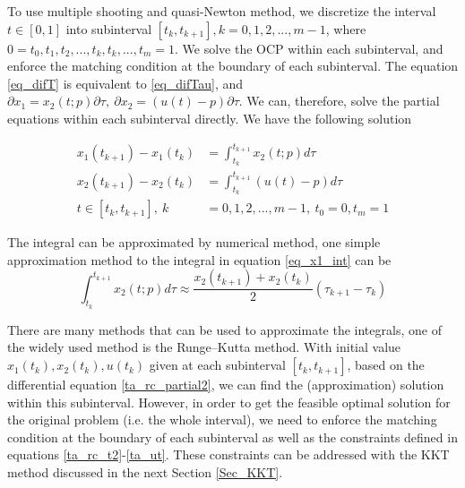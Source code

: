 	To use multiple shooting and quasi-Newton method, we discretize the interval $t\in [0,1]$ into subinterval $[t_{k}, t_{k+1}], k = 0, 1, 2, ..., m-1$, where $0 = t_0, t_1, t_2, ...,t_k, t_k, ..., t_m = 1$. We solve the OCP within each subinterval, and enforce the matching condition at the boundary of each subinterval. The equation \ref{eq_difT} is equivalent to \ref{eq_difTau}, and $\partial x_1= x_2(t;p) \partial \tau, \ \partial x_2 = ( u(t)-p) \partial \tau$. We can, therefore, solve the partial equations within each subinterval directly. We have the following solution
	
	\begin{subequations}
		\begin{align}
			x_1(t_{k+1}) -  x_1(t_k)  &= \int_{t_k}^{t_{k+1}} x_2(t;p) d \tau \label{eq_x1_int} \\
			x_2(t_{k+1}) -  x_2(t_k)  &= \int_{t_k}^{t_{k+1}} (u(t)-p) d \tau \\
			t \in [t_{k}, t_{k+1}], \  k &= 0, 1, 2, ..., m-1, \  t_0 =0, t_m =1
		\end{align}
	\end{subequations}
	
	The integral can be approximated by numerical method, one simple approximation method to the integral in equation \ref{eq_x1_int} can be 
	\begin{equation}
		\int_{t_k}^{t_{k+1}} x_2(t;p) d \tau  \approx \frac{x_2(t_{k+1}) + x_2(t_k)}{2} (\tau_{k+1} -\tau_k)
		\label{mid_approx}
	\end{equation}
	
	There are many methods that can be used to approximate the integrals, one of the widely used method is the Runge–Kutta method. With initial value $x_1(t_k),x_2(t_k), u(t_k)$ given at each subinterval $[t_{k}, t_{k+1}]$, based on the differential equation \ref{ta_rc_partial2}, we can find the (approximation) solution within this subinterval. 
	However, in order to get the feasible optimal solution for the original problem (i.e. the whole interval), we need to enforce the matching condition at the boundary of each subinterval as well as the constraints defined in equations \ref{ta_rc_t2}-\ref{ta_ut}.  These constraints can be addressed with the KKT method discussed in the next Section \ref{Sec_KKT}.
	
	
